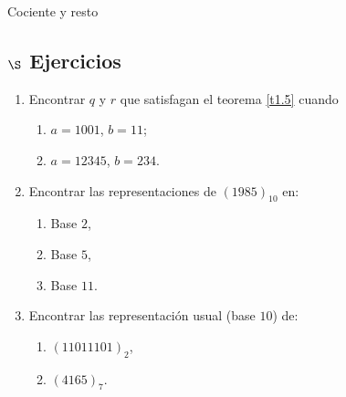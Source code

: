 \begin{section}{Cociente y resto}
\subsection*{\Large $\S$ Ejercicios}
\begin{enumerate}
\item Encontrar $q$ y $r$ que satisfagan el teorema \ref{t1.5} cuando
\begin{enumerate}
	\item $a = 1001$, \qquad $b = 11$;
	
	\item $a = 12345$, \qquad $b = 234$.
\end{enumerate}


\item Encontrar las representaciones de $(1985)_{10}$ en:
\begin{enumerate}
	\item Base $2$,
	
	\item Base $5$,
	
	\item Base $11$.
\end{enumerate}

\item  Encontrar las representación usual (base $10$) de:
\begin{enumerate}
	\item $(11011101)_2$,
	
	\item $(4165)_7.$
\end{enumerate}
 
\end{enumerate}
\end{section}


